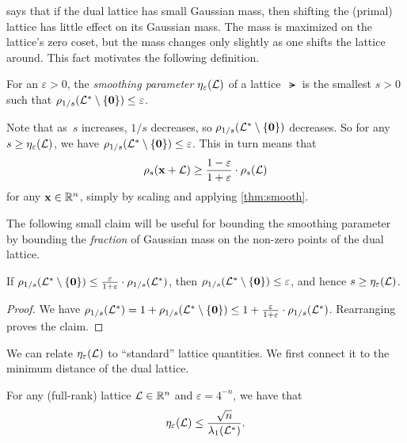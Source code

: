 \documentclass[11pt]{article}
\begin{document}
 says that if the dual lattice has small Gaussian
mass, then shifting the (primal) lattice has little effect on its
Gaussian mass. The mass is maximized on the lattice's zero coset, but
the mass changes only slightly as one shifts the lattice around. This
fact motivates the following definition.

\begin{definition}
  For an $\varepsilon > 0$, the \emph{smoothing parameter}
  $\eta_{\varepsilon}(\mathcal{L})$ of a lattice~$\lat$ is the smallest
  $s > 0$ such that
  $\rho_{1/s}(\mathcal{L}^* \setminus \{\mathbf{0}\}) \leq \varepsilon$.
\end{definition}

Note that as~$s$ increases, $1/s$ decreases, so
$\rho_{1/s}(\mathcal{L}^* \setminus \{\mathbf{0}\})$ decreases. So for any
$s \geq \eta_{\varepsilon}(\mathcal{L})$, we have
$\rho_{1/s}(\mathcal{L}^{*} \setminus \{\mathbf{0}\}) \leq \varepsilon$. This
in turn means that
\[ \rho_{s}(\mathbf{x} + \mathcal{L}) \geq \frac{1-\varepsilon}{1+\varepsilon}
  \cdot \rho_{s}(\mathcal{L}) \] for any $\mathbf{x} \in \mathbb{R}^{n}$, simply by
scaling and applying \cref{thm:smooth}.

The following small claim will be useful for bounding the smoothing
parameter by bounding the \emph{fraction} of Gaussian mass on the
non-zero points of the dual lattice.

\begin{claim}
  \label{clm:relative-smoothing}
  If
  $\rho_{1/s}(\mathcal{L}^* \setminus \{\mathbf{0}\}) \leq
  \frac{\varepsilon}{1+\varepsilon} \cdot \rho_{1/s}(\mathcal{L}^*)$, then
  $\rho_{1/s}(\mathcal{L}^* \setminus \{\mathbf{0}\}) \leq \varepsilon$, and
  hence $s \geq \eta_{\varepsilon}(\mathcal{L})$.
\end{claim}

\begin{proof}
  We have
  $\rho_{1/s}(\mathcal{L}^*) = 1 + \rho_{1/s}(\mathcal{L}^* \setminus
  \{\mathbf{0}\}) \leq 1 + \frac{\varepsilon}{1+\varepsilon} \cdot
  \rho_{1/s}(\mathcal{L}^{*})$. Rearranging proves the claim.
\end{proof}

We can relate $\eta_\varepsilon(\mathcal{L})$ to ``standard'' lattice
quantities. We first connect it to the minimum distance of the dual
lattice.

\begin{lemma}
  For any (full-rank) lattice $\mathcal{L} \in \mathbb{R}^{n}$ and
  $\varepsilon = 4^{-n}$, we have that
  \[ \eta_\varepsilon(\mathcal{L}) \leq
    \frac{\sqrt{n}}{\lambda_1(\mathcal{L}^*)} . \]
\end{lemma}
\end{document}
